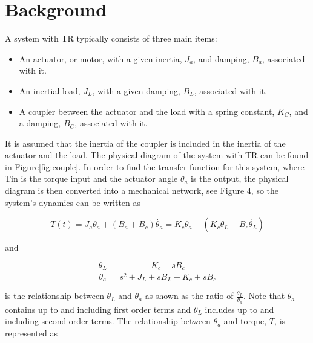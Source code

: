 \section{Background}
A system with TR typically consists of three main items:
\begin{itemize}
\item An actuator, or motor, with a given inertia, $J_a$, and damping, $B_a$, associated with it.
\item An inertial load, $J_L$, with a given damping, $B_L$, associated with it.
\item A coupler between the actuator and the load with a spring constant, $K_C$, and a damping, $B_C$, associated with it.
\end{itemize}

It is assumed that the inertia of the coupler is included in the inertia of the actuator and the load. The physical diagram of the system with TR can be found in Figure\ref{fig:couple}. In order to find the transfer function for this system, where Tin is the torque input and the actuator angle $\theta_a$ is the output, the physical diagram is then converted into a mechanical network, see Figure 4, so the system's dynamics can be written as

\begin{equation}
T(t) = J_a\ddot{\theta_a}+(B_a+B_c ) \dot{\theta_a}=K_c\theta_a-(K_c\theta_L+B_c\dot{\theta_L})
\end{equation}

and



\begin{equation}\label{eq:thetaLthetaa}
\frac{\theta_L}{\theta_a} = \frac{K_c+sB_c}{s^2+J_L+sB_L+K_c+sB_c}
\end{equation}

is the relationship between $\theta_L$ and $\theta_a$ as shown as the ratio of $\frac{\theta_L}{\theta_a}$. Note that $\theta_a$ contains up to and including first order terms and $\theta_L$ includes up to and including second order terms.  The relationship between $\theta_a$ and torque, $T$, is represented as




